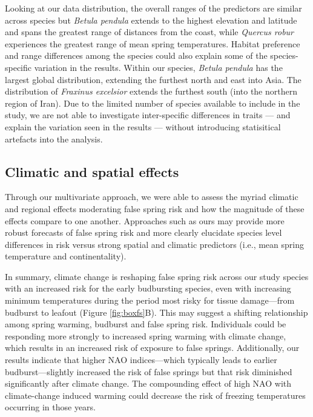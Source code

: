 \documentclass{article}\usepackage[]{graphicx}\usepackage[]{color}
\begin{document}
Looking at our data distribution, the overall ranges of the predictors are similar across species but \textit{Betula pendula} extends to the highest elevation and latitude and spans the greatest range of distances from the coast, while \textit{Quercus robur} experiences the greatest range of mean spring temperatures. Habitat preference and range differences among the species could also explain some of the species-specific variation in the results. Within our species, \textit{Betula pendula} has the largest global distribution, extending the furthest north and east into Asia. The distribution of \textit{Fraxinus excelsior} extends the furthest south (into the northern region of Iran). Due to the limited number of species available to include in the study, we are not able to investigate inter-specific differences in traits --- and explain the variation seen in the results --- without introducing statisitical artefacts into the analysis.   
  
\subsection*{Climatic and spatial effects}
Through our multivariate approach, we were able to assess the myriad climatic and regional effects moderating false spring risk and how the magnitude of these effects compare to one another. Approaches such as ours may provide more robust forecasts of false spring risk and more clearly elucidate species level differences in risk versus strong spatial and climatic predictors (i.e., mean spring temperature and continentality). 

In summary, climate change is reshaping false spring risk across our study species with an increased risk for the early budbursting species, even with increasing minimum temperatures during the period most risky for tissue damage---from budburst to leafout (Figure \ref{fig:boxfs}B). This may suggest a shifting relationship among spring warming, budburst and false spring risk. Individuals could be responding more strongly to increased spring warming with climate change, which results in an increased risk of exposure to false springs. Additionally, our results indicate that higher NAO indices---which typically leads to earlier budburst---slightly increased the risk of false springs but that risk diminished significantly after climate change. The compounding effect of high NAO with climate-change induced warming could decrease the risk of freezing temperatures occurring in those years.
\end{document}
